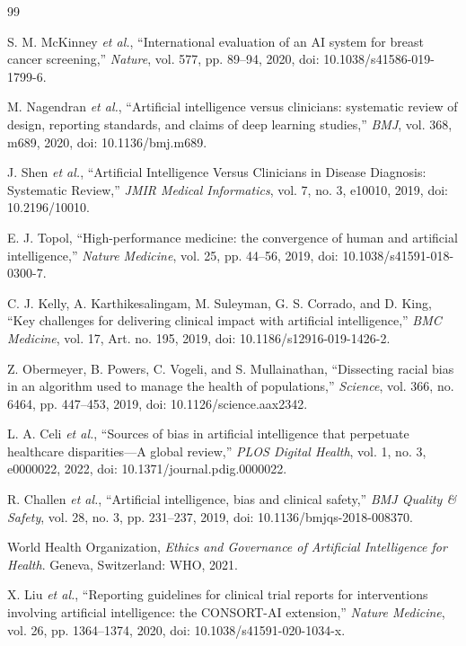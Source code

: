 \documentclass[conference]{IEEEtran}
\begin{document}
\begin{thebibliography}{99}

S. M. McKinney \textit{et al.}, ``International evaluation of an AI system for breast cancer screening,'' \emph{Nature}, vol. 577, pp. 89--94, 2020, doi: 10.1038/s41586-019-1799-6.

M. Nagendran \textit{et al.}, ``Artificial intelligence versus clinicians: systematic review of design, reporting standards, and claims of deep learning studies,'' \emph{BMJ}, vol. 368, m689, 2020, doi: 10.1136/bmj.m689.

J. Shen \textit{et al.}, ``Artificial Intelligence Versus Clinicians in Disease Diagnosis: Systematic Review,'' \emph{JMIR Medical Informatics}, vol. 7, no. 3, e10010, 2019, doi: 10.2196/10010.

E. J. Topol, ``High-performance medicine: the convergence of human and artificial intelligence,'' \emph{Nature Medicine}, vol. 25, pp. 44--56, 2019, doi: 10.1038/s41591-018-0300-7.

C. J. Kelly, A. Karthikesalingam, M. Suleyman, G. S. Corrado, and D. King, ``Key challenges for delivering clinical impact with artificial intelligence,'' \emph{BMC Medicine}, vol. 17, Art. no. 195, 2019, doi: 10.1186/s12916-019-1426-2.

Z. Obermeyer, B. Powers, C. Vogeli, and S. Mullainathan, ``Dissecting racial bias in an algorithm used to manage the health of populations,'' \emph{Science}, vol. 366, no. 6464, pp. 447--453, 2019, doi: 10.1126/science.aax2342.

L. A. Celi \textit{et al.}, ``Sources of bias in artificial intelligence that perpetuate healthcare disparities---A global review,'' \emph{PLOS Digital Health}, vol. 1, no. 3, e0000022, 2022, doi: 10.1371/journal.pdig.0000022.

R. Challen \textit{et al.}, ``Artificial intelligence, bias and clinical safety,'' \emph{BMJ Quality \& Safety}, vol. 28, no. 3, pp. 231--237, 2019, doi: 10.1136/bmjqs-2018-008370.

World Health Organization, \emph{Ethics and Governance of Artificial Intelligence for Health}. Geneva, Switzerland: WHO, 2021.

X. Liu \textit{et al.}, ``Reporting guidelines for clinical trial reports for interventions involving artificial intelligence: the CONSORT-AI extension,'' \emph{Nature Medicine}, vol. 26, pp. 1364--1374, 2020, doi: 10.1038/s41591-020-1034-x.


\end{thebibliography}
\end{document}
